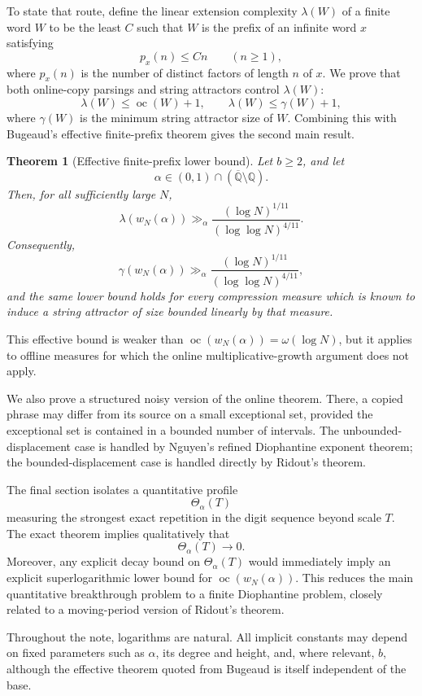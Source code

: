 \documentclass[11pt]{amsart}
\newtheorem{theorem}{Theorem}[section]
\theoremstyle{definition}
\DeclareMathOperator{\oc}{oc}
\begin{document}
To state that route, define the linear extension complexity \(\lambda(W)\) of a finite word \(W\) to be the least \(C\) such that \(W\) is the prefix of an infinite word \(x\) satisfying
\[
p_x(n)\leq Cn
\qquad(n\geq 1),
\]
where \(p_x(n)\) is the number of distinct factors of length \(n\) of \(x\). We prove that both online-copy parsings and string attractors control \(\lambda(W)\):
\[
\lambda(W)\leq \oc(W)+1,
\qquad
\lambda(W)\leq \gamma(W)+1,
\]
where \(\gamma(W)\) is the minimum string attractor size of \(W\). Combining this with Bugeaud's effective finite-prefix theorem gives the second main result.

\begin{theorem}[Effective finite-prefix lower bound]
Let \(b\geq 2\), and let
\[
\alpha\in (0,1)\cap(\overline{\mathbb Q}\setminus\mathbb Q).
\]
Then, for all sufficiently large \(N\),
\[
\lambda(w_N(\alpha))
\gg_{\alpha}
\frac{(\log N)^{1/11}}{(\log\log N)^{4/11}}.
\]
Consequently,
\[
\gamma(w_N(\alpha))
\gg_{\alpha}
\frac{(\log N)^{1/11}}{(\log\log N)^{4/11}},
\]
and the same lower bound holds for every compression measure which is known to induce a string attractor of size bounded linearly by that measure.
\end{theorem}

This effective bound is weaker than \(\oc(w_N(\alpha))=\omega(\log N)\), but it applies to offline measures for which the online multiplicative-growth argument does not apply.

We also prove a structured noisy version of the online theorem. There, a copied phrase may differ from its source on a small exceptional set, provided the exceptional set is contained in a bounded number of intervals. The unbounded-displacement case is handled by Nguyen's refined Diophantine exponent theorem; the bounded-displacement case is handled directly by Ridout's theorem.

The final section isolates a quantitative profile
\[
\Theta_\alpha(T)
\]
measuring the strongest exact repetition in the digit sequence beyond scale \(T\). The exact theorem implies qualitatively that
\[
\Theta_\alpha(T)\to 0.
\]
Moreover, any explicit decay bound on \(\Theta_\alpha(T)\) would immediately imply an explicit superlogarithmic lower bound for \(\oc(w_N(\alpha))\). This reduces the main quantitative breakthrough problem to a finite Diophantine problem, closely related to a moving-period version of Ridout's theorem.

Throughout the note, logarithms are natural. All implicit constants may depend on fixed parameters such as \(\alpha\), its degree and height, and, where relevant, \(b\), although the effective theorem quoted from Bugeaud is itself independent of the base.
\end{document}
